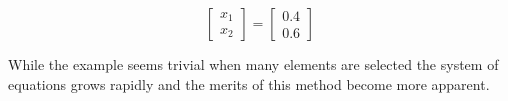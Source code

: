 \documentclass[a4paper, 12pt]{article}
\begin{document}
\begin{minipage}{0.4\textwidth}
	\begin{equation*}
	\begin{bmatrix}
	x_1 \\
	x_2
	\end{bmatrix}
	=
	\begin{bmatrix}
	0.4 \\
	0.6
	\end{bmatrix}
	\end{equation*}
\end{minipage}
\hfill
\begin{minipage}{0.6\textwidth}
	While the example seems trivial when many elements are selected the system of equations grows rapidly and the merits of this method become more apparent. \\
	
	
\end{minipage}
\end{document}
